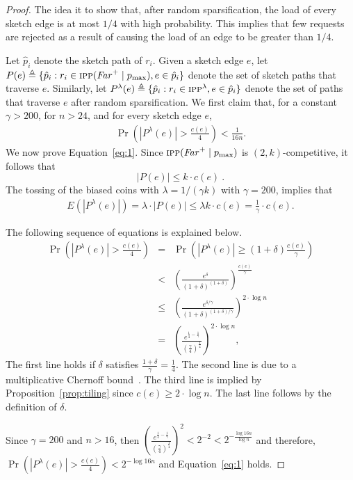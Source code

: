 \documentclass[11pt]{article}
\newcommand{\route}{\text{\sc{ipp}}}
\newcommand{\IPP}{\route}
\newcommand{\pmax}{p_{\max}}
\newenvironment{proof sketch}[1]{\noindent {\emph{Proof sketch of #1:}}}{\hfill \qed}
\newcommand{\far}{\text{\emph{Far}}}
\newcommand{\RIPP}{\IPP(\far^+ \mid \pmax)}\newcommand{\RIPPt}{\IPP^{\lambda}}
\begin{document}
\begin{proof}
The idea it to show that, after random sparsification, the load of every sketch edge is at
most $1/4$ with high probability. This implies that few requests are rejected
as a result of causing the load of an edge to be greater than $1/4$.

Let $\hat p_i$ denote the sketch path of $r_i$.  Given a sketch edge $e$, let $P(e)
\triangleq \{ \hat p_i : r_i\in \RIPP, e \in \hat p_i\}$ denote the set of sketch
paths that traverse $e$.  Similarly, let $P^{\lambda}(e) \triangleq \{ \hat p_i : r_i\in
\RIPPt, e \in \hat p_i\}$ denote the set of paths that traverse $e$ after random
sparsification.  We first claim that, for a constant $\gamma>200$, for $n > 24$, and
for every sketch edge $e$, \begin{align}
  \label{eq:1}
  \Pr \left(|P^{\lambda}(e)| > \frac{c(e)}{4} \right) < \frac 1 {16n}.
\end{align}
We now prove Equation~\eqref{eq:1}.  Since $\RIPP$ is $(2,k)$-competitive, it follows
that $$|P(e)| \leq k\cdot c(e)\:.$$ The tossing of the biased coins with $\lambda =
1/(\gamma k)$ with $\gamma=200$, implies that
\begin{align*}
  E (|P^{\lambda}(e)|) = \lambda \cdot |P(e)| \leq \lambda k \cdot c(e) = \frac {1}{\gamma}\cdot c(e).
\end{align*}

\noindent
The following sequence of equations is explained below.
    \begin{eqnarray*}
        \Pr \left(|P^{\lambda}(e)| > \frac{c(e)}{4} \right)
        & = & \Pr \left(|P^{\lambda}(e)| \geq (1+\delta)\frac{c(e)}{\gamma} \right) \\
        & < &    \left( \frac {e^{\delta}}{(1+\delta)^{(1+\delta)}} \right)^{\frac{c(e)}{\gamma}}\\
        & \leq & \left( \frac {e^{\delta/\gamma}}{(1+\delta)^{(1+\delta)/\gamma}} \right)^{2\cdot\log n} \\
        & = & \left(\frac {e^{\frac14 - \frac{1}{\gamma}}}{(\frac {\gamma}{4})^{\frac 14}} \right)^{2\cdot\log n},
    \end{eqnarray*}
    The first line holds if $\delta$ satisfies $\frac
    {1+\delta}{\gamma} = \frac {1}{4}$.
The second line is due to a multiplicative Chernoff bound~\cite{MU}.
The third line is implied by Proposition~\ref{prop:tiling} since
    $c(e) \geq 2\cdot\log n$.
The last line follows by the definition of $\delta$.

Since $\gamma=200$ and $n > 16$, then $\left(\frac {e^{\frac14 - \frac{1}{\gamma}}}{(\frac
      {\gamma}{4})^{\frac 14}}\right)^2 < 2^{-2} < 2^{-\frac {\log 16n}{\log
        n}}$ and therefore, $\Pr \left(|P^{\lambda}(e)| > \frac{c(e)}{4} \right) < 2^{-\log 16n}$ and Equation~\eqref{eq:1}
    holds.



\end{proof}
\end{document}

